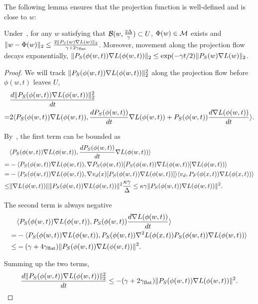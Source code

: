 The following lemma ensures that the projection function is well-defined and is close to $w$:

\begin{lemma}
\label{lem:phiexists}
Under~, for any $w$ satisfying that $\mathcal{B}(w, \frac{2 \Delta}{\gamma}) \subset U$, $\Phi(w) \in \mathcal{M}$ exists and $\|w  - \Phi(w) \|_2 \le \frac{2 \| {P}_S(w) \nabla L(w) \|_2}{\gamma + 2\gamma_{\mathrm{flat}}}$.
Moreover, movement along the projection flow decays exponentially,  $\|{P}_S(\phi(w,t)) \nabla L(\phi(w,t)) \|_2 \le \exp(-\gamma t/2) \| {P}_S(w) \nabla L(w) \|_2$.
\end{lemma}

\begin{proof}
We will track $\| {P}_S(\phi(w,t)) \nabla L(\phi(w,t))\|_2^2$ along the projection flow before $\phi(w, t)$ leaves $U$,
\begin{align*}
    &\frac{d \|{P}_S(\phi(w,t)) \nabla L(\phi(w,t)) \|_2^2}{dt} \\=& 2 \langle {P}_S(\phi(w,t)) \nabla L(\phi(w,t)), \frac{d  {P}_S(\phi(w,t))}{dt} \nabla L(\phi(w,t)) + {P}_S(\phi(w,t)) \frac{d  \nabla L(\phi(w,t))}{dt}\rangle.
\end{align*}


By~, the first term can be bounded as
\begin{align*}
    & \langle {P}_S(\phi(w,t)) \nabla L(\phi(w,t)), \frac{d  {P}_S(\phi(w,t))}{dt} \nabla L(\phi(w,t)) \rangle  \\
    =&-\langle {P}_S(\phi(w,t)) \nabla L(\phi(w,t)),\nabla  {P}_S(\phi(w,t))[{P}_S(\phi(w,t))\nabla L(\phi(w,t)) ]\nabla L(\phi(w,t)) \rangle \\
    =&- \langle {P}_S(\phi(w,t)) \nabla L(\phi(w,t)), \nabla v_d (x)[{P}_S(\phi(w,t))\nabla L(\phi(w,t)) ] \rangle  \langle v_d, {P}_F(\phi(x,t)) \nabla L(\phi(x,t)) \rangle  \\
    \le& \| \nabla L(\phi(w,t)) \| \| {P}_S(\phi(w,t)) \nabla L(\phi(w,t))\|^2 \frac{\kappa \gamma}{\Delta} \le \kappa \gamma  \| {P}_S(\phi(w,t)) \nabla L(\phi(w,t))\|^2.
\end{align*}

The second term is always negative
\begin{align*}
    &\langle {P}_S(\phi(w,t)) \nabla L(\phi(w,t)),   {P}_S(\phi(w,t)) \frac{d  \nabla L(\phi(w,t))}{dt}\rangle \\
    =& -\langle{P}_S(\phi(w,t)) \nabla L(\phi(w,t)), {P}_S(\phi(w,t)) \nabla^2 L(\phi(x,t))  {P}_S(\phi(w,t)) \nabla L(\phi(w,t)) \rangle \\
    \le& - (\gamma + 4\gamma_{\mathrm{flat}}) \| {P}_S(\phi(w,t)) \nabla L(\phi(w,t)) \|^2.
\end{align*}

Summing up the two terms,
\begin{align*}
    \frac{d \|{P}_S(\phi(w,t)) \nabla L(\phi(w,t)) \|_2^2}{dt}  \le -(\gamma + 2 \gamma_{\mathrm{flat}}) \| {P}_S(\phi(w,t)) \nabla L(\phi(w,t)) \|^2.
\end{align*}


\end{proof}
